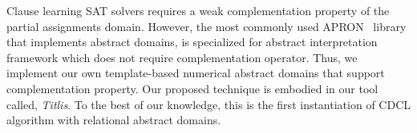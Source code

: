 Clause learning SAT solvers requires a weak complementation property 
of the partial assignments domain.  However,  the most commonly 
used APRON~\cite{apron} library that implements abstract domains, is specialized 
for abstract interpretation framework which does not require complementation 
operator.  Thus, we implement our own template-based numerical abstract 
domains that support complementation property.  Our proposed technique 
is embodied in our tool called, {\em Titlis}.  To the best of our 
knowledge, this is the first instantiation of CDCL 
algorithm with relational abstract domains. 
 
